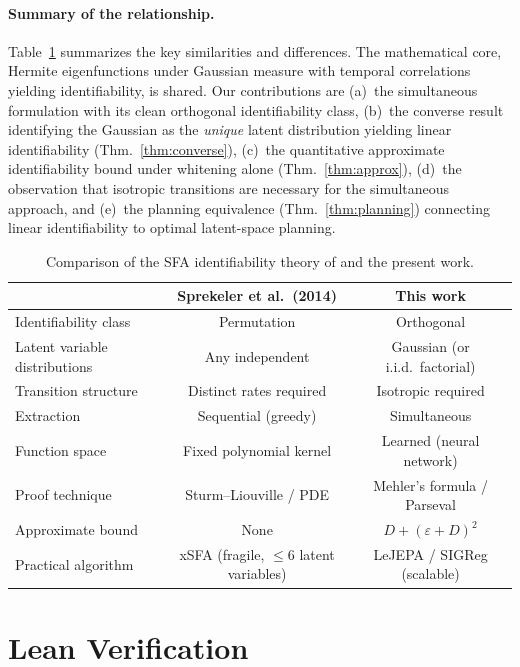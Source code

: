 \paragraph{Summary of the relationship.}
Table~\ref{tab:comparison-sfa} summarizes the key similarities and differences.
The mathematical core, Hermite eigenfunctions under Gaussian measure with temporal correlations yielding identifiability, is shared.
Our contributions are (a)~the simultaneous formulation with its clean orthogonal identifiability class, (b)~the converse result identifying the Gaussian as the \emph{unique} latent distribution yielding linear identifiability (Thm.~\ref{thm:converse}), (c)~the quantitative approximate identifiability bound under whitening alone (Thm.~\ref{thm:approx}), (d)~the observation that isotropic transitions are necessary for the simultaneous approach, and (e)~the planning equivalence (Thm.~\ref{thm:planning}) connecting linear identifiability to optimal latent-space planning.

\begin{table}[t]
\centering
\small
\begin{tabular}{lcc}
\toprule
& \textbf{Sprekeler et al.\ (2014)} & \textbf{This work} \\
\midrule
Identifiability class & Permutation & Orthogonal \\
Latent variable distributions & Any independent & Gaussian (or i.i.d.\ factorial) \\
Transition structure & Distinct rates required & Isotropic required \\
Extraction & Sequential (greedy) & Simultaneous \\
Function space & Fixed polynomial kernel & Learned (neural network) \\
Proof technique & Sturm--Liouville / PDE & Mehler's formula / Parseval \\
Approximate bound & None & $D + (\varepsilon + D)^2$ \\
Practical algorithm & xSFA (fragile, $\leq 6$ latent variables) & LeJEPA / SIGReg (scalable) \\
\bottomrule
\end{tabular}
\vspace{5pt}
\caption{Comparison of the SFA identifiability theory of \citet{sprekeler2014} and the present work.}
\label{tab:comparison-sfa}
\end{table}





\section{Lean Verification}\label{app:lean}

